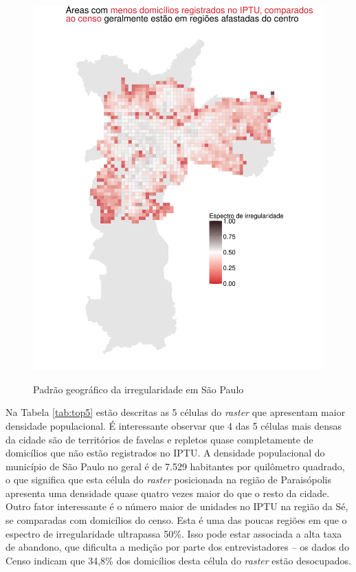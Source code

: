 \begin{apendicesenv}
\begin{figure}[h]
    \caption{Padrão geográfico da irregularidade em São Paulo}
    \centering
    \includegraphics[width = .8\linewidth]{figuras/balanco_raster.pdf}
    \label{fig:balanco-raster}
\end{figure}



Na Tabela \ref{tab:top5} estão descritas as 5 células do \textit{raster} que apresentam maior densidade populacional. É interessante observar que 4 das 5 células mais densas da cidade são de territórios de favelas e repletos quase completamente de domicílios que não estão registrados no IPTU. A densidade populacional do município de São Paulo no geral é de 7.529 habitantes por quilômetro quadrado, o que significa que esta célula do \textit{raster} posicionada na região de Paraisópolis apresenta uma densidade quase quatro vezes maior do que o resto da cidade. Outro fator interessante é o número maior de unidades no IPTU na região da Sé, se comparadas com domicílios do censo. Esta é uma das poucas regiões em que o espectro de irregularidade ultrapassa 50\%. Isso pode estar associada a alta taxa de abandono, que dificulta a medição por parte dos entrevistadores -- os dados do Censo indicam que 34,8\% dos domicílios desta célula do \textit{raster} estão desocupados.




\end{apendicesenv}
